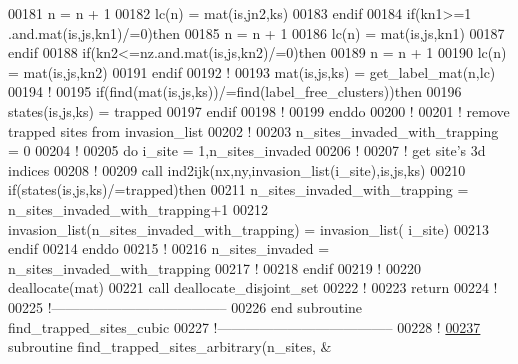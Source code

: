 \begin{DoxyCode}
00181              n = n + 1
00182              lc(n) = mat(is,jn2,ks) 
00183           \textcolor{keyword}{endif}
00184           \textcolor{keyword}{if}(kn1>=1 .and.mat(is,js,kn1)/=0)\textcolor{keyword}{then} 
00185              n = n + 1
00186              lc(n) = mat(is,js,kn1) 
00187           \textcolor{keyword}{endif}
00188           \textcolor{keyword}{if}(kn2<=nz.and.mat(is,js,kn2)/=0)\textcolor{keyword}{then} 
00189              n = n + 1
00190              lc(n) = mat(is,js,kn2) 
00191           \textcolor{keyword}{endif}
00192           \textcolor{comment}{!}
00193           mat(is,js,ks) = get\_label\_mat(n,lc)
00194           \textcolor{comment}{!}
00195           \textcolor{keyword}{if}(find(mat(is,js,ks))/=find(label\_free\_clusters))\textcolor{keyword}{then}
00196              states(is,js,ks) = trapped
00197           \textcolor{keyword}{endif}
00198           \textcolor{comment}{!}
00199        \textcolor{keyword}{enddo}
00200        \textcolor{comment}{!}
00201        \textcolor{comment}{! remove trapped sites from invasion\_list}
00202        \textcolor{comment}{!}
00203        n\_sites\_invaded\_with\_trapping = 0
00204        \textcolor{comment}{!}
00205        \textcolor{keyword}{do} i\_site = 1,n\_sites\_invaded
00206           \textcolor{comment}{!}
00207           \textcolor{comment}{! get site's 3d indices}
00208           \textcolor{comment}{!}
00209           call ind2ijk(nx,ny,invasion\_list(i\_site),is,js,ks)
00210           \textcolor{keyword}{if}(states(is,js,ks)/=trapped)\textcolor{keyword}{then}
00211              n\_sites\_invaded\_with\_trapping = n\_sites\_invaded\_with\_trapping+1
00212              invasion\_list(n\_sites\_invaded\_with\_trapping) = invasion\_list(
      i\_site)
00213           \textcolor{keyword}{endif}
00214        \textcolor{keyword}{enddo}
00215        \textcolor{comment}{!}
00216        n\_sites\_invaded = n\_sites\_invaded\_with\_trapping
00217        \textcolor{comment}{!}
00218     \textcolor{keyword}{endif}
00219     \textcolor{comment}{!}
00220     \textcolor{keyword}{deallocate}(mat)
00221     call deallocate\_disjoint\_set
00222     \textcolor{comment}{!}
00223     return
00224     \textcolor{comment}{!}
00225   \textcolor{comment}{!--------------------------------------}
00226 \textcolor{keyword}{  end subroutine find\_trapped\_sites\_cubic}
00227   \textcolor{comment}{!--------------------------------------}
00228   \textcolor{comment}{!}
\hypertarget{module__trapping_8f90_source_l00237}{}\hyperlink{classmodule__trapping_ae74b46d92d3e8dfd116fa288aa279107}{00237}   \textcolor{keyword}{subroutine }find\_trapped\_sites\_arbitrary(n\_sites,           &

\end{DoxyCode}
